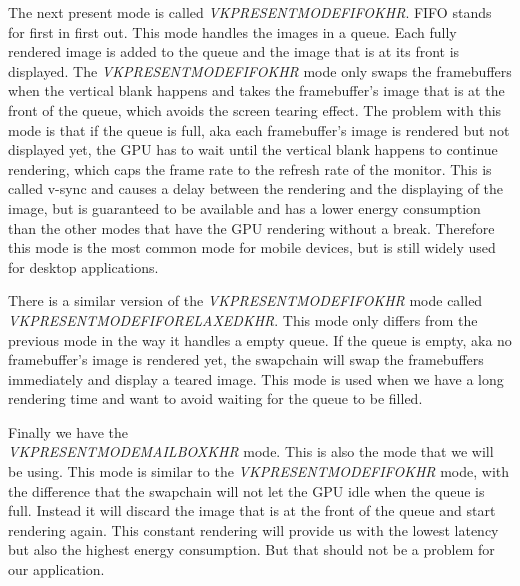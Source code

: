 \documentclass[12pt]{report} \usepackage{preamble}
\begin{document}
The next present mode is called
\textit{VK\textunderscore PRESENT\textunderscore MODE\textunderscore FIFO\textunderscore KHR}.
FIFO stands for first in first out. This mode handles the images in a queue. Each fully rendered image
is added to the queue and the image that is at its front is displayed. The
\textit{VK\textunderscore PRESENT\textunderscore MODE\textunderscore FIFO\textunderscore KHR} mode
only swaps the framebuffers when the vertical blank happens and takes the framebuffer's image that is at the front
of the queue, which avoids the screen tearing effect. The problem with this mode is that if the queue is full,
aka each framebuffer's image is rendered but not displayed yet, the \ac{GPU} has to wait until the vertical blank happens
to continue rendering, which caps the frame rate to the refresh rate of the monitor. This is called v-sync and
causes a delay between the rendering and the displaying of the image, but is guaranteed
to be available and has a lower energy consumption than the other modes that have the \ac{GPU} rendering without a break.
Therefore this mode is the most common mode for mobile devices, but is still widely used for desktop applications.

There is a similar version of the
\textit{VK\textunderscore PRESENT\textunderscore MODE\textunderscore FIFO\textunderscore KHR} mode called \\
\textit{VK\textunderscore PRESENT\textunderscore MODE\textunderscore FIFO\textunderscore RELAXED\textunderscore KHR}.
This mode only differs from the previous mode in the way it handles a empty queue. If the queue is empty, aka no
framebuffer's image is rendered yet, the swapchain will swap the framebuffers immediately and display a teared image. This mode
is used when we have a long rendering time and want to avoid waiting for the queue to be filled.

Finally we have the \\
\textit{VK\textunderscore PRESENT\textunderscore MODE\textunderscore MAILBOX\textunderscore KHR} mode.
This is also the mode that we will be using. This mode is similar to the
\textit{VK\textunderscore PRESENT\textunderscore MODE\textunderscore FIFO\textunderscore KHR} mode,
with the difference that the swapchain will not let the \ac{GPU} idle when the queue is full. Instead it will
discard the image that is at the front of the queue and start rendering again. This constant rendering
will provide us with the lowest latency but also the highest energy consumption. But that should not
be a problem for our application.
\end{document}
